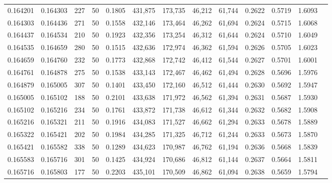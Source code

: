 \begin{tabular}{rrrrrrrrrrrrr}
0.164201 & 0.164303 &   227 &  50 &                                     0.1805 & 431,875 & 173,735 &  46,212 &  61,744 & 0.2622 & 0.5719 & 1.6093 \\
0.164303 & 0.164436 &   271 &  50 &                                     0.1558 & 432,146 & 173,464 &  46,262 &  61,694 & 0.2624 & 0.5715 & 1.6068 \\
0.164437 & 0.164534 &   210 &  50 &                                     0.1923 & 432,356 & 173,254 &  46,312 &  61,644 & 0.2624 & 0.5710 & 1.6049 \\
0.164535 & 0.164659 &   280 &  50 &                                     0.1515 & 432,636 & 172,974 &  46,362 &  61,594 & 0.2626 & 0.5705 & 1.6023 \\
0.164659 & 0.164760 &   232 &  50 &                                     0.1773 & 432,868 & 172,742 &  46,412 &  61,544 & 0.2627 & 0.5701 & 1.6001 \\
0.164761 & 0.164878 &   275 &  50 &                                     0.1538 & 433,143 & 172,467 &  46,462 &  61,494 & 0.2628 & 0.5696 & 1.5976 \\
0.164879 & 0.165005 &   307 &  50 &                                     0.1401 & 433,450 & 172,160 &  46,512 &  61,444 & 0.2630 & 0.5692 & 1.5947 \\
0.165005 & 0.165102 &   188 &  50 &                                     0.2101 & 433,638 & 171,972 &  46,562 &  61,394 & 0.2631 & 0.5687 & 1.5930 \\
0.165102 & 0.165216 &   234 &  50 &                                     0.1761 & 433,872 & 171,738 &  46,612 &  61,344 & 0.2632 & 0.5682 & 1.5908 \\
0.165216 & 0.165321 &   211 &  50 &                                     0.1916 & 434,083 & 171,527 &  46,662 &  61,294 & 0.2633 & 0.5678 & 1.5889 \\
0.165322 & 0.165421 &   202 &  50 &                                     0.1984 & 434,285 & 171,325 &  46,712 &  61,244 & 0.2633 & 0.5673 & 1.5870 \\
0.165421 & 0.165582 &   338 &  50 &                                     0.1289 & 434,623 & 170,987 &  46,762 &  61,194 & 0.2636 & 0.5668 & 1.5839 \\
0.165583 & 0.165716 &   301 &  50 &                                     0.1425 & 434,924 & 170,686 &  46,812 &  61,144 & 0.2637 & 0.5664 & 1.5811 \\
0.165716 & 0.165803 &   177 &  50 &                                     0.2203 & 435,101 & 170,509 &  46,862 &  61,094 & 0.2638 & 0.5659 & 1.5794 \\

\end{tabular}
